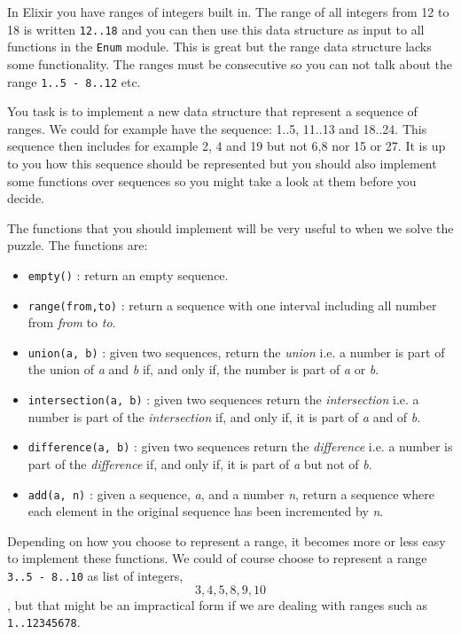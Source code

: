 \documentclass[a4paper,11pt]{article}
\begin{document}
In Elixir you have ranges of integers built in. The range of all
integers from 12 to 18 is written {\tt 12..18} and you can then use
this data structure as input to all functions in the {\tt Enum}
module. This is great but the range data structure lacks some
functionality. The ranges must be consecutive so you can not talk
about the range {\tt 1..5 - 8..12} etc.

You task is to implement a new data structure that represent a
sequence of ranges. We could for example have the sequence: 1..5,
11..13 and 18..24. This sequence then includes for example 2, 4 and 19
but not 6,8 nor 15 or 27. It is up to you how this sequence should be
represented but you should also implement some functions over sequences
so you might take a look at them before you decide.

The functions that you should implement will be very useful to when
we solve the puzzle. The functions are:

\begin{itemize}
 \item {\tt empty()} : return an empty sequence.

 \item {\tt range(from,to)} : return a sequence with one interval
   including all number from {\em from} to {\em to}.

 \item {\tt union(a, b)} : given two sequences, return the {\em union}
   i.e. a number is part of the union of {\em a} and {\em b} if, and
   only if, the number is part of {\em a} or {\em b}.

 \item {\tt intersection(a, b)} : given two sequences return the {\em
     intersection} i.e. a number is part of the {\em intersection} if, and
   only if, it is part of {\em a} and of {\em b}.

 \item {\tt difference(a, b)} : given two sequences return the {\em
     difference} i.e. a number is part of the {\em difference} if, and
   only if, it is part of {\em a} but not of {\em b}.

 \item {\tt add(a, n)} : given a sequence, {\em a}, and a number {\em n},
   return a sequence where each element in the original sequence has been
   incremented by {\em n}.
\end{itemize}

Depending on how you choose to represent a range, it becomes more or
less easy to implement these functions. We could of course choose to
represent a range {\tt 3..5 - 8..10} as list of
integers,{\tt \[3,4,5,8,9,10\]}, but that might be an impractical form
if we are dealing with ranges such as {\tt 1..12345678}.
\end{document}
